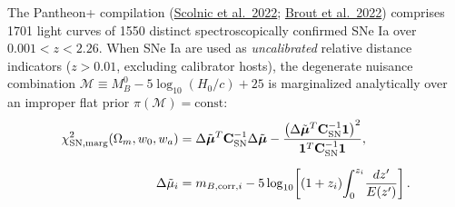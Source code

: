 \documentclass[aps,prd,preprint,superscriptaddress,nofootinbib]{revtex4-2}
\begin{document}
The Pantheon+ compilation (\href{https://arxiv.org/abs/2112.03863}{Scolnic et al.\ 2022}; \href{https://arxiv.org/abs/2202.04077}{Brout et al.\ 2022}) comprises 1701 light curves of 1550 distinct spectroscopically confirmed SNe Ia over $0.001 < z < 2.26$. When SNe Ia are used as \emph{uncalibrated} relative distance indicators ($z > 0.01$, excluding calibrator hosts), the degenerate nuisance combination $\mathcal{M} \equiv M_B^0 - 5\log_{10}(H_0/c) + 25$ is marginalized analytically over an improper flat prior $\pi(\mathcal{M}) = \text{const}$:
\begin{equation}
\begin{aligned}
    \chi^2_{\text{SN,marg}}(\Omega_m, w_0, w_a) &= \Delta\tilde{\boldsymbol{\mu}}^T \mathbf{C}_{\rm SN}^{-1} \Delta\tilde{\boldsymbol{\mu}} - \frac{\left(\Delta\tilde{\boldsymbol{\mu}}^T \mathbf{C}_{\rm SN}^{-1} \mathbf{1}\right)^2}{\mathbf{1}^T \mathbf{C}_{\rm SN}^{-1} \mathbf{1}}, \\[6pt]
    \Delta\tilde{\mu}_i &= m_{B,\text{corr},i} - 5\log_{10}\!\left[(1+z_i)\!\int_0^{z_i}\!\frac{dz'}{E(z')}\right].
\end{aligned}
    \label{m:eq:chi2_sn_marg}
\end{equation}
\end{document}
